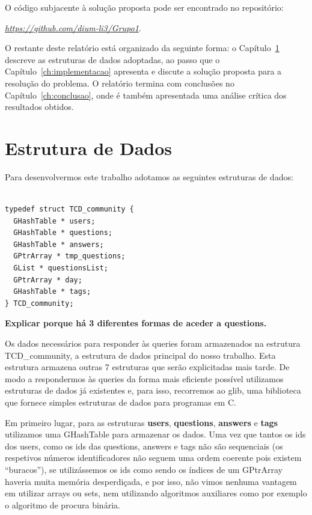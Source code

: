 \documentclass[a4paper]{report}
\begin{document}
O código subjacente à solução proposta pode ser encontrado no repositório:

\begin{center}
\href{https://github.com/dium-li3/Grupo1}{\emph{https://github.com/dium-li3/Grupo1}}.
\end{center}

O restante deste relatório está organizado da seguinte forma: o
Capítulo~\ref{ch:estruturadedados} descreve as estruturas de dados adoptadas,
ao passo que o Capítulo~\ref{ch:implementacao}  apresenta e discute a solução
proposta para a resolução do problema. O relatório termina com conclusões no
Capítulo~\ref{ch:conclusao}, onde é também apresentada uma análise crítica dos
resultados obtidos.



\chapter{Estrutura de Dados}
\label{ch:estruturadedados}

Para desenvolvermos este trabalho adotamos as seguintes estruturas de dados:

\begin{verbatim}

typedef struct TCD_community {
  GHashTable * users;
  GHashTable * questions;
  GHashTable * answers;
  GPtrArray * tmp_questions;
  GList * questionsList;
  GPtrArray * day;
  GHashTable * tags;
} TCD_community;

\end{verbatim}

\textbf{Explicar porque há 3 diferentes formas de aceder a questions.}

\vspace{0.4cm}

Os dados necessários para responder às queries foram armazenados
na estrutura TCD\_community, a estrutura de dados principal do nosso trabalho.
Esta estrutura armazena outras 7 estruturas que serão explicitadas mais tarde.
De modo a respondermos às queries da forma mais eficiente possível
utilizamos estruturas de dados já existentes e, para isso, recorremos ao glib,
uma biblioteca que fornece simples estruturas de dados para programas em C.

\vspace{0.4cm}

Em primeiro lugar, para as estruturas \textbf{users}, \textbf{questions},
\textbf{answers} e \textbf{tags}
utilizamos uma GHashTable para armazenar os dados.
Uma vez que tantos os ids dos users, como os ids das questions, answers
e tags não são sequenciais (os respetivos números identificadores não
seguem uma ordem coerente pois existem “buracos”), se utilizássemos
os ids como sendo os índices de um GPtrArray haveria muita memória desperdiçada,
e por isso, não vimos nenhuma vantagem em utilizar arrays ou sets, nem
utilizando algoritmos auxiliares como por exemplo o algoritmo de procura binária.
\end{document}
